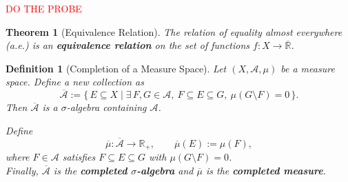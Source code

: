 \documentclass[10pt, oneside]{article}
\newenvironment{theorembox}[1][]{\begin{thmbox}\begin{thm}[#1]}{\end{thm}\end{thmbox}}
\newenvironment{definitionbox}[1][]{\begin{defbox}\begin{defn}[#1]}{\end{defn}\end{defbox}}
\numberwithin{equation}{section}
\newtheorem{thm}{Theorem}[section]
\newtheorem{defn}{Definition}[section]
\begin{document}
\textcolor{red}{DO THE PROBE}
\begin{theorembox}[Equivalence Relation]
The relation of equality almost everywhere (a.e.) is an \textbf{equivalence relation}  
on the set of functions \( f : X \to \overline{\mathbb{R}} \).
\end{theorembox}

\begin{definitionbox}[Completion of a Measure Space]
Let \((X, \mathcal{A}, \mu)\) be a measure space.  
Define a new collection as
\[
\overline{\mathcal{A}}
:= 
\{\, E \subseteq X \mid \exists\, F, G \in \mathcal{A},\ F \subseteq E \subseteq G,\ 
\mu(G \setminus F) = 0 \,\}.
\]
Then \(\overline{\mathcal{A}}\) is a $\sigma$-algebra containing $\mathcal{A}$.

Define
\[
\overline{\mu} : \overline{\mathcal{A}} \longrightarrow \mathbb{R}_+,
\qquad
\overline{\mu}(E) := \mu(F),
\]
where \(F \in \mathcal{A}\) satisfies \(F \subseteq E \subseteq G\) with \(\mu(G \setminus F) = 0\).\\
Finally, $\overline{\mathcal{A}}$ is the \textbf{completed $\sigma$-algebra} and $\overline{\mu}$ is the \textbf{completed measure}.
\end{definitionbox}
\end{document}
